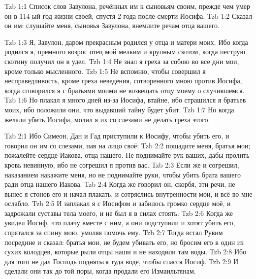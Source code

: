 \vs Tzb 1:1
Список слов Завулона, речённых им к сыновьям своим,
прежде чем умер он в 114-ый год жизни своей,
спустя 2 года после смерти Иосифа.
\vs Tzb 1:2
Сказал он им: слушайте меня, сыновья Завулона, внемлите речам отца вашего.

\vs Tzb 1:3
Я, Завулон, даром прекрасным родился у отца и матери моих.
Ибо когда родился я, премного возрос отец мой мелким и крупным
скотом, когда пеструю скотину получил он в удел.
\vs Tzb 1:4
Не знал я греха за собою во все дни мои, кроме только мысленного.
\vs Tzb 1:5
Не вспомню, чтобы совершил я несправедливость,
кроме греха неведения, сотворенного мною против Иосифа,
когда сговорился я с братьями моими не возвещать отцу моему о случившемся.
\vs Tzb 1:6
Но плакал я много дней из-за Иосифа, втайне, ибо страшился я братьев моих,
ибо положили они, что выдавший тайну будет убит.
\vs Tzb 1:7
Но когда желали убить Иосифа, молил я их со слезами не делать греха этого.

\vs Tzb 2:1
Ибо Симеон, Дан и Гад приступили к Иосифу, чтобы убить его,
и говорил он им со слезами, пав на лицо своё:
\vs Tzb 2:2
пощадите меня, братья мои; пожалейте сердце Иакова, отца нашего.
Не поднимайте рук ваших, дабы пролить кровь невинную,
ибо не согрешил я против вас.
\vs Tzb 2:3
Если же и согрешил, наказанием накажите меня,
но не поднимайте руки,
чтобы убить брата вашего ради отца нашего Иакова.
\vs Tzb 2:4
Когда же говорил он, скорбя, эти речи,
не вынес я стонов его и начал плакать,
и сотряслись внутренности мои, и всё во мне ослабло.
\vs Tzb 2:5
И заплакал я с Иосифом и забилось громко сердце моё,
и задрожали суставы тела моего, и не был я в силах стоять.
\vs Tzb 2:6
Когда же увидел Иосиф, что плачу вместе с ним,
а они подступили и хотят убить его, спрятался за спину мою,
умоляя помочь ему.
\vs Tzb 2:7
Тогда встал Рувим посредине и сказал:
братья мои, не будем убивать его,
но бросим его в один из сухих колодцев,
которые рыли отцы наши и не находили там воды.
\vs Tzb 2:8
Ибо для того не дал Господь подняться туда воде,
чтобы спасся Иосиф.
\vs Tzb 2:9
И сделали они так до той поры,
когда продали его Измаильтянам.

